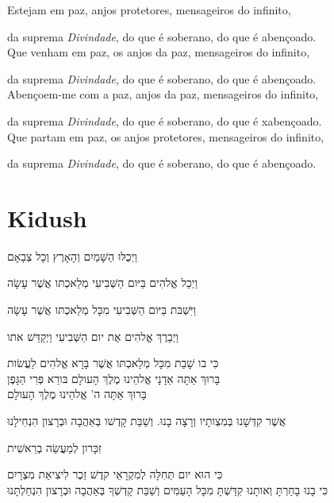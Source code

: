 Estejam em paz, anjos protetores,\qb{} mensageiros do infinito,

da suprema \emph{Divindade},  \qb{}do que é soberano, do que é abençoado.\\[10pt]

Que venham em paz, os anjos da paz,\qb{} mensageiros do infinito,

da suprema \emph{Divindade},\qb{} do que é soberano, do que é abençoado.\\[10pt]

Abençoem-me com a paz,\qb{} anjos da paz, mensageiros do infinito,

da suprema \emph{Divindade},\qb{} do que é soberano, do que é xabençoado.\\[10pt]

Que partam em paz, os anjos\qb{} protetores, mensageiros do infinito,

da suprema \emph{Divindade}, \qb{}do que é soberano, do que é abençoado.

\movetoevenpage
\raggedleft

\section{Kidush}

וַיְכֻלּוּ הַשָּׁמַיִם וְהָאָרֶץ וְכָל צְבָאָם

וַיְכַל אֱלהִים בַּיּום הַשְּׁבִיעִי מְלַאכְתּו אֲשֶׁר עָשָׂה

וַיִּשְׁבּת בַּיּום הַשְּׁבִיעִי מִכָּל מְלַאכְתּו אֲשֶׁר עָשָׂה

וַיְבָרֶךְ אֱלהִים אֶת יום הַשְּׁבִיעִי וַיְקַדֵּשׁ אתו

כִּי בו שָׁבַת מִכָּל מְלַאכְתּו אֲשֶׁר בָּרָא אֱלהִים לַעֲשׂות\\[10pt]

בָּרוּךְ אַתָּה אַדָנָי אֱלהֵינוּ מֶלֶךְ הָעולָם בּורֵא פְּרִי הַגָּפֶן\\[10pt]

בָּרוּךְ אַתָּה ה' אֱלהֵינוּ מֶלֶךְ הָעולָם

אֲשֶׁר קִדְּשָׁנוּ בְּמִצְותָיו וְרָצָה בָנוּ. וְשַׁבַּת קָדְשׁו
בְּאַהֲבָה וּבְרָצון הִנְחִילָנוּ

זִכָּרון לְמַעֲשֵׂה בְרֵאשִׁית

כִּי הוּא יום תְּחִלָּה לְמִקְרָאֵי קדֶשׁ זֵכֶר לִיצִיאַת מִצְרָיִם\\[10pt]

כִּי בָנוּ בָחַרְתָּ וְאותָנוּ קִדַּשְׁתָּ מִכָּל הָעַמִּים וְשַׁבַּת
קָדְשְׁךָ בְּאַהֲבָה וּבְרָצון הִנְחַלְתָּנוּ


